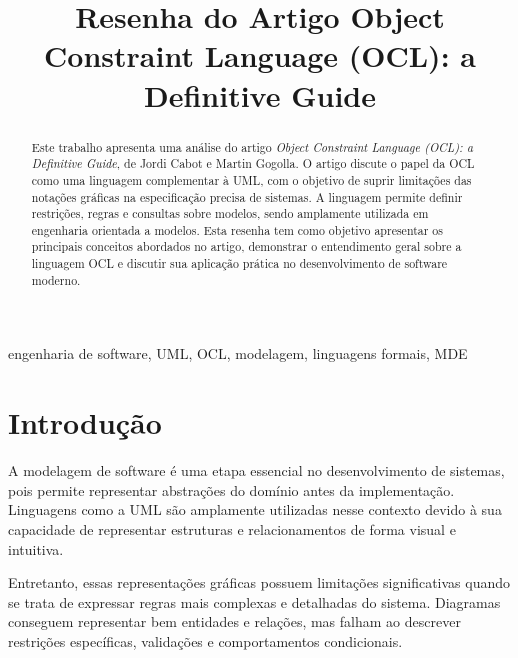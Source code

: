 \documentclass[conference]{IEEEtran}
\begin{document}
\title{Resenha do Artigo Object Constraint Language (OCL): a Definitive Guide}

\author{
}

\maketitle

\begin{abstract}

Este trabalho apresenta uma análise do artigo \textit{Object Constraint Language (OCL): a Definitive Guide}, de Jordi Cabot e Martin Gogolla. O artigo discute o papel da OCL como uma linguagem complementar à UML, com o objetivo de suprir limitações das notações gráficas na especificação precisa de sistemas. A linguagem permite definir restrições, regras e consultas sobre modelos, sendo amplamente utilizada em engenharia orientada a modelos. Esta resenha tem como objetivo apresentar os principais conceitos abordados no artigo, demonstrar o entendimento geral sobre a linguagem OCL e discutir sua aplicação prática no desenvolvimento de software moderno.

\end{abstract}

\begin{IEEEkeywords}
engenharia de software, UML, OCL, modelagem, linguagens formais, MDE
\end{IEEEkeywords}

\section{Introdução}

A modelagem de software é uma etapa essencial no desenvolvimento de sistemas, pois permite representar abstrações do domínio antes da implementação. Linguagens como a UML são amplamente utilizadas nesse contexto devido à sua capacidade de representar estruturas e relacionamentos de forma visual e intuitiva.

Entretanto, essas representações gráficas possuem limitações significativas quando se trata de expressar regras mais complexas e detalhadas do sistema. Diagramas conseguem representar bem entidades e relações, mas falham ao descrever restrições específicas, validações e comportamentos condicionais.
\end{document}
